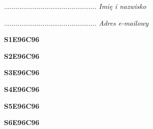 \begin{turn}{90}\begin{minipage}{\linewidth} \vspace{20mm} ................................................  \textit{Imię i nazwisko}\end{minipage}\end{turn}

\begin{turn}{90}\begin{minipage}{\linewidth} \vspace{20mm} ................................................  \textit{Adres e-mailowy}\end{minipage}\end{turn}

\begin{turn}{90}\huge \begin{minipage}{\linewidth} \vspace{10mm}\textbf{S1E96C96}\end{minipage}\end{turn}

\begin{turn}{90}\huge \begin{minipage}{\linewidth} \vspace{10mm}\textbf{S2E96C96}\end{minipage}\end{turn}

\begin{turn}{90}\huge \begin{minipage}{\linewidth} \vspace{10mm}\textbf{S3E96C96}\end{minipage}\end{turn}

\begin{turn}{90}\huge \begin{minipage}{\linewidth} \vspace{10mm}\textbf{S4E96C96}\end{minipage}\end{turn}

\begin{turn}{90}\huge \begin{minipage}{\linewidth} \vspace{10mm}\textbf{S5E96C96}\end{minipage}\end{turn}

\begin{turn}{90}\huge \begin{minipage}{\linewidth} \vspace{10mm}\textbf{S6E96C96}\end{minipage}\end{turn}

